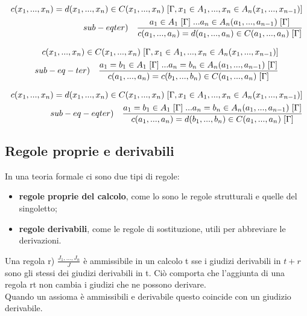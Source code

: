 \[
\begin{split}
c(x_1,...,x_n) = d(x_1,...,x_n)  \in C(x_1,...,x_n) \hspace{0.1cm}[\Gamma, x_1 \in A_1,...,x_n \in A_n(x_1,...,x_{n-1})] \\ sub-eqter) \quad \frac{a_1 \in A_1\hspace{0.1cm}[\Gamma]\hspace{0.1cm}...a_n \in A_n(a_1,...,a_{n-1})\hspace{0.1cm}[\Gamma]}{ c(a_1,...,a_n) = d(a_1,...,a_n) \in C(a_1,...,a_n)\hspace{0.1cm}[\Gamma]}
\end{split}
\]

\[
\begin{split}
c(x_1,...,x_n) \in C(x_1,...,x_n) \hspace{0.1cm}[\Gamma, x_1 \in A_1,...,x_n \in A_n(x_1,...,x_{n-1})] \\ sub-eq-ter) \quad \frac{a_1 = b_1 \in A_1\hspace{0.1cm}[\Gamma]\hspace{0.1cm}...a_n = b_n \in A_n(a_1,...,a_{n-1})\hspace{0.1cm}[\Gamma]}{ c(a_1,...,a_n) = c(b_1,...,b_n) \in C(a_1,...,a_n)\hspace{0.1cm}[\Gamma]}
\end{split}
\]

\[
\begin{split}
c(x_1,...,x_n) = d(x_1,...,x_n) \in C(x_1,...,x_n) \hspace{0.1cm}[\Gamma, x_1 \in A_1,...,x_n \in A_n(x_1,...,x_{n-1})] \\ sub-eq-eqter) \quad \frac{a_1 = b_1 \in A_1\hspace{0.1cm}[\Gamma]\hspace{0.1cm}...a_n = b_n \in A_n(a_1,...,a_{n-1})\hspace{0.1cm}[\Gamma]}{ c(a_1,...,a_n) = d(b_1,...,b_n) \in C(a_1,...,a_n)\hspace{0.1cm}[\Gamma]}
\end{split}
\]

\subsection{Regole proprie e derivabili}
\label{subsec:regole-proprie-derivabili}
In una teoria formale ci sono due tipi di regole:
\begin{itemize}
\item \textbf{regole proprie del calcolo}, come lo sono le regole strutturali e quelle del singoletto;
\item \textbf{regole derivabili}, come le regole di sostituzione, utili per abbreviare le derivazioni.
\end{itemize}
\noindent
Una regola r) $\frac{J_1,...,J_n}{J}$ \`e ammissibile in un calcolo t sse i giudizi derivabili in $t+r$ sono gli stessi dei giudizi derivabili in t. Ci\`o comporta che l'aggiunta di una regola rt non cambia i giudizi che ne possono derivare.\\ Quando un assioma \`e ammissibili e derivabile questo coincide con un giudizio derivabile.

